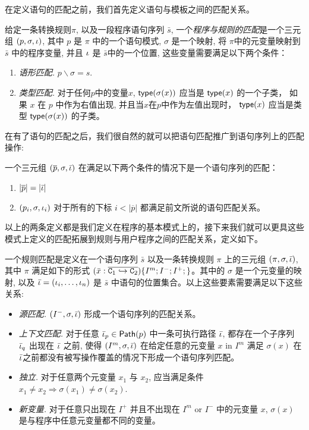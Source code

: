 在定义语句的匹配之前，我们首先定义语句与模板之间的匹配关系。

\begin{definition}[语句匹配]
给定一条转换规则$\pi$, 以及一段程序语句序列 $\bar{s}$, 一个\emph{程序与规则的匹配}是一个三元组 $(p, \sigma, \iota)$, 其中 $p$ 是 $\pi$ 中的一个语句模式,  $\sigma$ 是一个映射, 将 $\pi$中的元变量映射到$\bar{s}$ 中的程序变量, 并且 $\iota$ 是 $\bar{s}$中的一个位置, 这些变量需要满足以下两个条件： 

\begin{enumerate}
\item \emph{语形匹配.} $p\backslash \sigma = s$.
\item \emph{类型匹配.} 对于任何$p$中的变量$x$, 
  $\mathsf{type}(\sigma(x))$ 应当是 $\mathsf{type}(x)$ 的一个子类， 如果 $x$ 在 $p$ 中作为右值出现, 并且当$x$在$p$中作为左值出现时， $\mathsf{type}(x)$ 应当是类型 $\mathsf{type}(\sigma(x))$ 的子类。
\end{enumerate}
\end{definition}

在有了语句的匹配之后，我们很自然的就可以把语句匹配推广到语句序列上的匹配操作:

\begin{definition}[语句序列匹配]
一个三元组 $(\overline{p}, \sigma, \bar{\iota})$ 在满足以下两个条件的情况下是一个语句序列的匹配：
\begin{enumerate}
\item $|\overline{p}|=|\bar{\iota}|$
\item $(p_i, \sigma,
    \iota_i)$ 对于所有的下标 $i<|\overline{p}|$ 都满足前文所说的语句匹配关系。
\end{enumerate}
\end{definition}

以上的两条定义都是我们定义在程序的基本模式上的，接下来我们就可以更具这些模式上定义的匹配拓展到规则与用户程序之间的匹配关系，定义如下。


\begin{definition}[规则匹配] 
一个规则匹配是定义在一个语句序列 $\bar{s}$ 以及一条转换规则 $\pi$ 上的三元组 $(\pi, \sigma, \bar{\iota})$, 其中 $\pi$ 满足如下的形式
$(\bar{x}:\overline{\mathtt{C}_1\hookrightarrow\mathtt{C}_2})\{I^{m};I^{-};I^{+};\}$。其中的
$\sigma$ 是一个元变量的映射, 以及 $\bar{\iota}=(\iota_i, \ldots, \iota_n)$ 是 $\bar{s}$ 中语句的位置集合。以上这些要素需要满足以下这些关系:
\begin{itemize}
\item \emph{源匹配.} $(I^-, \sigma, \bar{\iota})$ 形成一个语句序列的匹配关系。
\item \emph{上下文匹配.} 对于任意 $\bar{\iota}_p \in \mathsf{Path}(p)$
  中一条可执行路径 $\bar{\iota}$, 都存在一个子序列 $\bar{\iota}_q$
  出现在 $\bar{\iota}$ 之前, 使得 $(I^m, \sigma, \bar{\iota})$ 在给定任意的元变量 $x$ in $I^m$ 满足 $\sigma(x)$ 在 $\bar{\iota}$之前都没有被写操作覆盖的情况下形成一个语句序列匹配。 
\item \emph{独立.} 对于任意两个元变量 $x_1$ 与 $x_2$, 应当满足条件 $x_1\neq x_2 \Rightarrow
  \sigma(x_1) \neq \sigma(x_2)$.
\item \emph{新变量.} 对于任意只出现在 $I^+$ 并且不出现在 $I^m$ or $I^-$ 中的元变量 $x$, $\sigma(x)$ 是与程序中任意元变量都不同的变量。
\end{itemize}
\end{definition}

